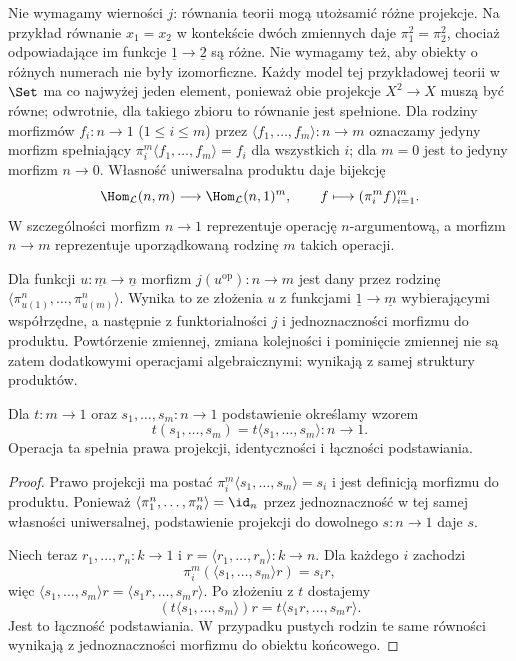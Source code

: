 Nie wymagamy wierności $j$: równania teorii mogą utożsamić różne projekcje. Na przykład równanie $x_1=x_2$ w kontekście dwóch zmiennych daje $\pi_1^2=\pi_2^2$, chociaż odpowiadające im funkcje $\underline1\to\underline2$ są różne. Nie wymagamy też, aby obiekty o różnych numerach nie były izomorficzne. Każdy model tej przykładowej teorii w $\Set$ ma co najwyżej jeden element, ponieważ obie projekcje $X^2\to X$ muszą być równe; odwrotnie, dla takiego zbioru to równanie jest spełnione. Dla rodziny morfizmów $f_i:n\to1$ ($1\leq i\leq m$) przez $\langle f_1,\ldots,f_m\rangle:n\to m$ oznaczamy jedyny morfizm spełniający $\pi_i^m\langle f_1,\ldots,f_m\rangle=f_i$ dla wszystkich $i$; dla $m=0$ jest to jedyny morfizm $n\to0$. Własność uniwersalna produktu daje bijekcję
\begin{equation}\label{cat:eq:lawvere-tuple}
 \Hom_{\mathcal L}(n,m)\longrightarrow
 \Hom_{\mathcal L}(n,1)^m,\qquad
 f\longmapsto(\pi_i^m f)_{i=1}^m.
\end{equation}
W szczególności morfizm $n\to1$ reprezentuje operację $n$-argumentową, a morfizm $n\to m$ reprezentuje uporządkowaną rodzinę $m$ takich operacji.

Dla funkcji $u:\underline m\to\underline n$ morfizm $j(u^{\mathrm{op}}):n\to m$ jest dany przez rodzinę $\langle\pi^n_{u(1)},\ldots,\pi^n_{u(m)}\rangle$. Wynika to ze złożenia $u$ z funkcjami $\underline 1\to\underline m$ wybierającymi współrzędne, a następnie z funktorialności $j$ i jednoznaczności morfizmu do produktu. Powtórzenie zmiennej, zmiana kolejności i pominięcie zmiennej nie są zatem dodatkowymi operacjami algebraicznymi: wynikają z samej struktury produktów.

\begin{stwierdzenie}\label{cat:prop:lawvere-substitution}
Dla $t:m\to1$ oraz $s_1,\ldots,s_m:n\to1$ podstawienie określamy wzorem
\[
 t(s_1,\ldots,s_m)=t\langle s_1,\ldots,s_m\rangle:n\to1.
\]
Operacja ta spełnia prawa projekcji, identyczności i łączności podstawiania.
\end{stwierdzenie}
\begin{proof}
Prawo projekcji ma postać $\pi_i^m\langle s_1,\ldots,s_m\rangle=s_i$ i jest definicją morfizmu do produktu. Ponieważ $\langle\pi_1^n,\ldots,\pi_n^n\rangle=\id_n$ przez jednoznaczność w tej samej własności uniwersalnej, podstawienie projekcji do dowolnego $s:n\to1$ daje $s$.

Niech teraz $r_1,\ldots,r_n:k\to1$ i $r=\langle r_1,\ldots,r_n\rangle:k\to n$. Dla każdego $i$ zachodzi
\[
 \pi_i^m(\langle s_1,\ldots,s_m\rangle r)=s_i r,
\]
więc $\langle s_1,\ldots,s_m\rangle r=\langle s_1r,\ldots,s_mr\rangle$. Po złożeniu z $t$ dostajemy
\[
 (t\langle s_1,\ldots,s_m\rangle)r
 =t\langle s_1r,\ldots,s_mr\rangle.
\]
Jest to łączność podstawiania. W przypadku pustych rodzin te same równości wynikają z jednoznaczności morfizmu do obiektu końcowego.
\end{proof}

